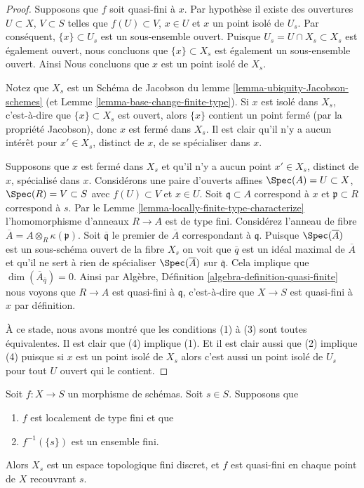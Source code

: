 \begin{proof}
Supposons que $f$ soit quasi-fini à $x$. Par hypothèse il existe
des ouvertures $U \subset X$, $V \subset S$ telles que $f(U) \subset V$, $x \in U$
et $x$ un point isolé de $U_s$. Par conséquent, $\{x\} \subset U_s$ est un sous-ensemble
ouvert. Puisque $U_s = U \cap X_s \subset X_s$ est également ouvert, nous concluons que $\{x\} \subset X_s$
est également un sous-ensemble ouvert. Ainsi Nous concluons que $x$
est un point isolé de $X_s$.

\medskip\noindent Notez
que $X_s$ est un Schéma de Jacobson
du lemme \ref{lemma-ubiquity-Jacobson-schemes} (et Lemme \ref{lemma-base-change-finite-type}).
Si
$x$ est isolé dans $X_s$, c'est-à-dire
que $\{x\} \subset X_s$ est ouvert, alors $\{x\}$ contient un point
fermé (par la propriété Jacobson), donc $x$ est fermé dans $X_s$.
Il est clair qu'il n'y a aucun intérêt pour $x' \in X_s$, distinct de $x$,
de se spécialiser dans $x$.

\medskip\noindent
Supposons que $x$ est fermé dans $X_s$ et qu'il n'y
a aucun point $x' \in X_s$, distinct de $x$, spécialisé dans
$x$. Considérons une paire d'ouverts affines
$\Spec(A) = U \subset X$, $\Spec(R) = V \subset S$ avec $f(U) \subset V$ et $x \in U$. Soit
$\mathfrak q \subset A$ correspond à $x$ et $\mathfrak p \subset R$
correspond à $s$. Par le Lemme \ref{lemma-locally-finite-type-characterize} l'homomorphisme
d'anneaux $R \to A$ est de type fini.
Considérez l'anneau de fibre $\overline{A} = A \otimes_R \kappa(\mathfrak p)$. Soit
$\overline{\mathfrak q}$ le premier de $\overline{A}$ correspondant à $\mathfrak q$.
Puisque $\Spec(\overline{A})$ est un sous-schéma ouvert de la fibre $X_s$
on voit que $\overline{q}$ est un idéal maximal
de $\overline{A}$ et qu'il ne sert à rien de spécialiser $\Spec(\overline{A})$
sur $\overline{\mathfrak q}$. Cela implique
que $\dim(\overline{A}_{\overline{q}}) = 0$. Ainsi par Algèbre, Définition
\ref{algebra-definition-quasi-finite}
nous voyons que $R \to A$ est quasi-fini
à $\mathfrak q$, c'est-à-dire que $X \to S$ est quasi-fini
à $x$ par définition.

\medskip\noindent À
ce stade, nous avons montré que les conditions (1) à (3) sont toutes équivalentes.
Il est clair que (4) implique (1). Et il est clair aussi que (2) implique
(4) puisque si $x$ est un point isolé de $X_s$ alors
c'est aussi un point isolé de $U_s$ pour tout $U$ ouvert
qui le contient.
\end{proof}

\begin{lemma}
\label{lemma-finite-fibre}
Soit $f : X \to S$ un morphisme de schémas. Soit
$s \in S$. Supposons que
\begin{enumerate}
\item $f$ est localement de type fini et que
\item $f^{-1}(\{s\})$ est un ensemble fini.
\end{enumerate}
Alors $X_s$ est un espace topologique fini discret, et $f$
est quasi-fini en chaque point de $X$ recouvrant $s$.
\end{lemma}


